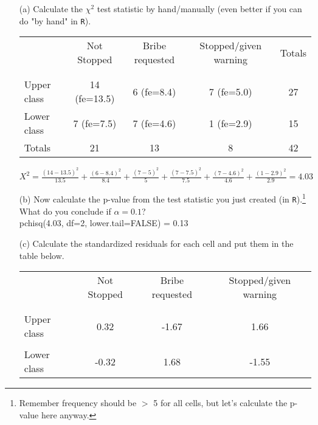 \documentclass[12pt,letterpaper]{article}
\begin{document}
\begin{enumerate}
	
	\item [(a)]
	Calculate the $\chi^2$ test statistic by hand/manually (even better if you can do "by hand" in \texttt{R}).\\

	\begin{table}[h!]
    	\centering
    	\begin{tabular}{l | c c c c }
    		& Not Stopped & Bribe requested & Stopped/given warning & Totals \\
    		\\[-1.8ex] 
    		\hline \\[-1.8ex]
    		Upper class & 14 (fe=13.5) & 6 (fe=8.4) & 7 (fe=5.0) & 27 \\
    		Lower class & 7 (fe=7.5) & 7 (fe=4.6) & 1 (fe=2.9) & 15 \\
    		Totals & 21 & 13 & 8 & 42 \\
    		\hline
    	\end{tabular}
    \end{table} 
    
    $
    X^2 = \frac{(14-13.5)^2}{13.5}
    + \frac{(6-8.4)^2}{8.4}
    + \frac{(7-5)^2}{5}
    + \frac{(7-7.5)^2}{7.5}
    + \frac{(7-4.6)^2}{4.6}
    + \frac{(1-2.9)^2}{2.9}
    = 4.03
    $
	
	
	
	\item [(b)]
	Now calculate the p-value from the test statistic you just created (in \texttt{R}).\footnote{Remember frequency should be $>$ 5 for all cells, but let's calculate the p-value here anyway.}  What do you conclude if $\alpha = 0.1$?\\
	
	pchisq(4.03, df=2, lower.tail=FALSE) = 0.13
	
	
	\newpage
	\item [(c)] Calculate the standardized residuals for each cell and put them in the table below.
	\vspace{1cm}
	
	\begin{table}[h]
		\centering
		\begin{tabular}{l | c c c }
			& Not Stopped & Bribe requested & Stopped/given warning \\
			\\[-1.8ex] 
			\hline \\[-1.8ex]
			Upper class  & 0.32 &  -1.67 & 1.66  \\
			\\
			Lower class & -0.32 &  1.68 &  -1.55 \\
	

\end{tabular}
\end{table}
\end{enumerate}
\end{document}
